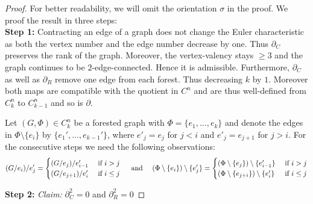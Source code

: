 \begin{proof}
	For better readability, we will omit the orientation $\sigma$ in the proof.
	We proof the result in three steps:\\
	\textbf{Step 1:} Contracting an edge of a graph does not change the Euler characteristic as both the vertex number and the edge number decrease by one.
	Thus $\partial_{C}$ preserves the rank of the graph. Moreover, the vertex-valency stays $\geq 3$ and the graph continues to be $2$-edge-connected.
	Hence it is admissible.
	Furthermore, $\partial_{C}$ as well as $\partial_{R}$ remove one edge from each forest. Thus decreasing
	$k$ by $1$. Moreover both maps are compatible with the quotient in $C^{n}$ and are thus well-defined from $C^{n}_{k}$ to $C^{n}_{k-1}$ and so is $\partial$.

	Let $(G,\Phi) \in C^{n}_{k}$ be a forested graph with $\Phi = \{e_1,\ldots,e_{k}\}$  and denote the edges in $\Phi \setminus \{e_{i}\}$ by $\{e_1',\ldots,e_{k-1}'\}$,
	where $e'_{j} = e_{j}$ for $j < i$ and $e'_{j} = e_{j+1}$ for $j > i$.
	For the consecutive steps we need the following observations:
	\[
		(G / e_{i}) /  e_{j}' = \begin{cases}
			(G / e_{j}) / e_{i-1}' & \text{ if } i > j\\
			(G / e_{j+1}) / e_{i}' & \text{ if } i \leq j
		\end{cases}
		\qq{ and }
		(\Phi \setminus \{e_{i}\}) \setminus \{e_{j}'\}  = \begin{cases}	
			(\Phi \setminus \{e_{j}\}) \setminus \{e_{i-1}'\} & \text{ if } i > j\\
			(\Phi \setminus \{e_{j+i}\}) \setminus \{e_{i}'\} & \text{ if } i \leq j
		\end{cases}
	\]

	\textbf{Step 2:} \emph{Claim:} $\partial_{C}^2 = 0$ and $\partial_{R}^2 = 0$


\end{proof}
